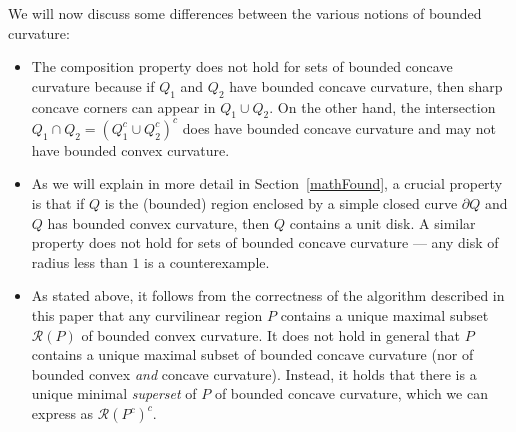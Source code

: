 \documentclass{article}
\newcommand{\PP}{P}
\newcommand{\QQ}{Q}
\newcommand{\round}{\mathcal R}
\begin{document}
We will now discuss some differences between the various notions of bounded curvature:
\begin{itemize}
\item
The composition property does not hold for sets of bounded concave curvature because if $\QQ_1$ and $\QQ_2$ have bounded concave curvature, then sharp concave corners can appear in $\QQ_1\cup\QQ_2$.
On the other hand, the intersection $\QQ_1\cap\QQ_2=(\QQ_1^c\cup\QQ_2^c)^c$ does have bounded concave curvature and may not have bounded convex curvature.

\item
As we will explain in more detail in Section~\ref{mathFound}, a crucial property is that if $\QQ$ is the (bounded) region enclosed by a simple closed curve $\partial\QQ$ and $\QQ$ has bounded convex curvature, then $\QQ$ contains a unit disk.
A similar property does not hold for sets of bounded concave curvature --- any disk of radius less than $1$ is a counterexample.

\item
As stated above, it follows from the correctness of the algorithm described in this paper that any curvilinear region $\PP$ contains a unique maximal subset $\round(\PP)$ of bounded convex curvature.
It does not hold in general that $\PP$ contains a unique maximal subset of bounded concave curvature (nor of bounded convex \emph{and} concave curvature).
Instead, it holds that there is a unique minimal \emph{superset} of $\PP$ of bounded concave curvature, which we can express as $\round(\PP^c)^c$.
\end{itemize}
\end{document}
